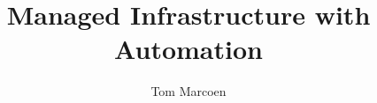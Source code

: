 \usepackage[margin=3cm,right=6cm]{geometry}
\usepackage[utf8]{inputenc}
\usepackage[T1]{fontenc}
\usepackage[osf]{libertine}
\usepackage[pdfencoding=auto]{hyperref}
\usepackage{bookmark} %

\newcommand*{\abbr}[1]{%
   \texorpdfstring{\textsc{\MakeLowercase{#1}}}{#1}%
}

\title{Managed Infrastructure with Automation}
\author{Tom Marcoen}